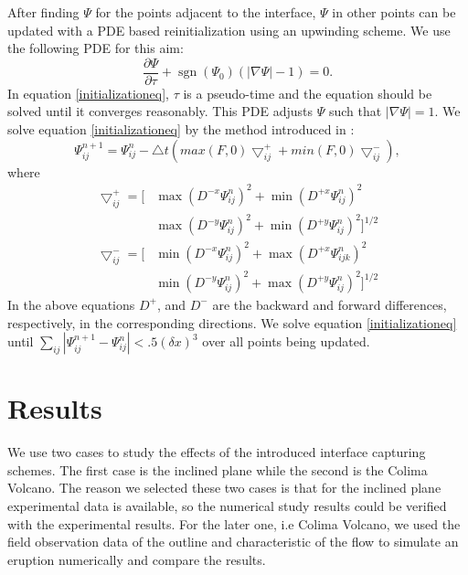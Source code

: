 \documentclass[letterpaper,10pt]{article}
\DeclareMathOperator{\sgn}{sgn}
\begin{document}
After finding $\varPsi$ for the points adjacent to the interface, $\varPsi$ in other points can be updated with a PDE based reinitialization using an upwinding scheme. 
We use the following PDE for this aim:
\begin{equation}\label{initializationeq}
        \frac{\partial \varPsi}{\partial \tau} + \sgn (\varPsi_0) (|\nabla \varPsi| - 1)= 0.
\end{equation}
In equation \eqref{initializationeq}, $\tau$ is a pseudo-time and the equation should be solved until it converges reasonably. This PDE adjusts $\varPsi$ such that $|\nabla \varPsi|=1$.
We solve equation \eqref{initializationeq} by the method introduced in \cite{Adalsteinsson1999}:
\begin{equation}
        \varPsi_{ij}^{n+1}=\varPsi_{ij}^{n}-\bigtriangleup t \left(max(F,0)\bigtriangledown_{ij}^{+}+min(F,0)\bigtriangledown_{ij}^{-} \right),
\end{equation}
where 
\begin{equation}
        \begin{aligned}
                \bigtriangledown_{ij}^{+} = \big[ & \max(D^{-x}\varPsi_{ij}^{n})^2 + \min(D^{+x}\varPsi_{ij}^{n})^2
                \\& \max(D^{-y}\varPsi_{ij}^{n})^2 + \min(D^{+y}\varPsi_{ij}^{n})^2 \big]^{1/2}
        \end{aligned}
\end{equation}
\begin{equation}
        \begin{aligned}
                \bigtriangledown_{ij}^{-} = \big[ & \min(D^{-x}\varPsi_{ij}^{n})^2 + \max(D^{+x}\varPsi_{ijk}^{n})^2
                \\& \min(D^{-y}\varPsi_{ij}^{n})^2 + \max(D^{+y}\varPsi_{ij}^{n})^2 \big]^{1/2}
        \end{aligned}
\end{equation} 
In the above equations $D^+$, and $D^-$ are the backward and forward differences, respectively, in the corresponding directions.
We solve equation \eqref{initializationeq} until $\sum\limits_{ij}|\varPsi_{ij}^{n+1} -\varPsi_{ij}^{n}| < .5 (\delta x)^3$ over all points being updated.

\section{Results} \label{results}
We use two cases to study the effects of the introduced interface capturing schemes. The first case is the inclined plane while the second is the Colima Volcano. 
The reason we selected these two cases is that for the inclined plane experimental data is available, so the numerical study results could be verified with the experimental results. 
For the later one, i.e Colima Volcano, we used the field observation data of the outline and characteristic of the flow to simulate an eruption numerically and compare the results.
\end{document}
